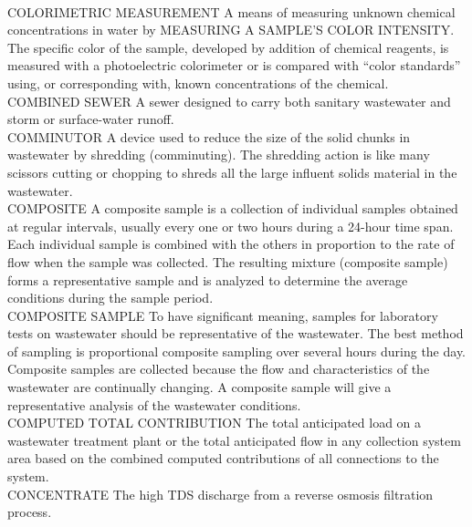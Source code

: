 \vspace{0.3cm}\\
COLORIMETRIC MEASUREMENT
A means of measuring unknown chemical concentrations in water by MEASURING A SAMPLE’S COLOR INTENSITY. The specific color of the sample, developed by addition of chemical reagents, is measured with a photoelectric colorimeter or is compared with “color standards” using, or corresponding with, known concentrations of the chemical.
\vspace{0.3cm}\\
COMBINED SEWER
A sewer designed to carry both sanitary wastewater and storm or surface-water runoff.
\vspace{0.3cm}\\
COMMINUTOR
A device used to reduce the size of the solid chunks in wastewater by shredding (comminuting). The shredding action is like many scissors cutting or chopping to shreds all the large influent solids material in the wastewater.
\vspace{0.3cm}\\
COMPOSITE
A composite sample is a collection of individual samples obtained at regular intervals, usually every one or two hours during a 24-hour time span. Each individual sample is combined with the others in proportion to the rate of flow when the sample was collected. The resulting mixture (composite sample) forms a representative sample and is analyzed to determine the average conditions during the sample period.
\vspace{0.3cm}\\
COMPOSITE SAMPLE
To have significant meaning, samples for laboratory tests on wastewater should be representative of the wastewater. The best method of sampling is proportional composite sampling over several hours during the day. Composite samples are collected because the flow and characteristics of the wastewater are continually changing. A composite sample will give a representative analysis of the wastewater conditions.
\vspace{0.3cm}\\
COMPUTED TOTAL CONTRIBUTION
The total anticipated load on a wastewater treatment plant or the total anticipated flow in any collection system area based on the combined computed contributions of all connections to the system. 
\vspace{0.3cm}\\
CONCENTRATE
The high TDS discharge from a reverse osmosis filtration process.
\vspace{0.3cm}\\
